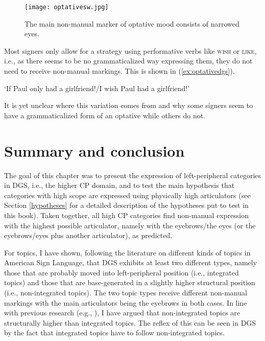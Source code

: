 \begin{figure}[bt]
\centering
	\texttt{[image: optativesw.jpg]}
	\caption{The main non-manual marker of optative mood consists of narrowed eyes.}
	\label{optativesnonmanuals}
\end{figure}

Most signers only allow for a strategy using performative verbs like \textsc{wish} or \textsc{like}, i.e., as there seems to be no grammaticalized way expressing them, they do not need to receive non-manual markings. This is shown in (\ref{ex:optativedgs}).

\begin{exe}

\glt `If Paul only had a girlfriend!/I wish Paul had a girlfriend!' \label{ex:optativedgs}

\end{exe}

\noindent It is yet unclear where this variation comes from and why some signers seem to have a grammaticalized form of an optative while others do not.


\section{Summary and conclusion}
The goal of this chapter was to present the expression of left-peripheral categories in DGS, i.e., the higher CP domain, and to test the main hypothesis that categories with high scope are expressed using physically high articulators (see Section \ref{hypotheses} for a detailed description of the hypotheses put to test in this book). Taken together, all high CP categories find non-manual expression with the highest possible articulator, namely with the eyebrows/the eyes (or the eyebrows/eyes plus another articulator), as predicted.

For topics, I have shown, following the literature on different kinds of topics in American Sign Language, that DGS exhibits at least two different types, namely those that are probably moved into left-peripheral position (i.e., integrated topics) and those that are base-generated in a slightly higher structural position (i.e., non-integrated topics). The two topic types receive different non-manual markings with the main articulators being the eyebrows in both cases. In line with previous research (e.g., \citealt{benincapol2004topic}), I have argued that non-integrated topics are structurally higher than integrated topics. The reflex of this can be seen in DGS by the fact that integrated topics have to follow non-integrated topics.

